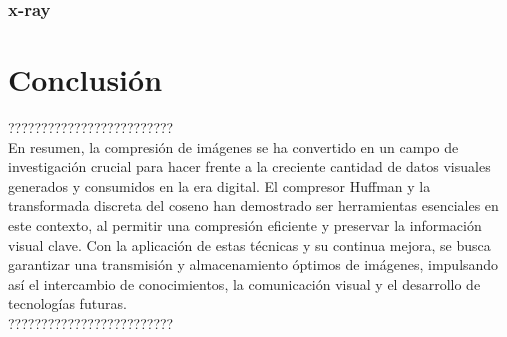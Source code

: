 \documentclass[12pt,a4paper]{article}
\begin{document}
\subsubsection{x-ray}


\newpage
\section{Conclusión}

?????????????????????????\\
En resumen, la compresión de imágenes se ha convertido en un campo de investigación crucial para hacer frente a la creciente cantidad de datos visuales generados y consumidos en la era digital. El compresor Huffman y la transformada discreta del coseno han demostrado ser herramientas esenciales en este contexto, al permitir una compresión eficiente y preservar la información visual clave. Con la aplicación de estas técnicas y su continua mejora, se busca garantizar una transmisión y almacenamiento óptimos de imágenes, impulsando así el intercambio de conocimientos, la comunicación visual y el desarrollo de tecnologías futuras.\\
?????????????????????????


\newpage
\end{document}
